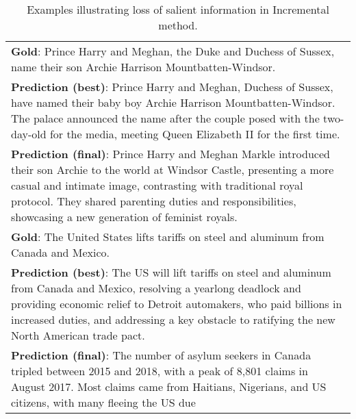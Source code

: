 \begin{table*}
{\begin{tabular}{p{24cm}}
    \midrule
    \textbf{Gold}: Prince Harry and Meghan, the Duke and Duchess of Sussex, name their son Archie Harrison Mountbatten-Windsor. \\
    \textbf{Prediction (best)}: Prince Harry and Meghan, Duchess of Sussex, have named their baby boy Archie Harrison Mountbatten-Windsor. The palace announced the name after the couple posed with the two-day-old for the media, meeting Queen Elizabeth II for the first time. \\
    \textbf{Prediction (final)}: Prince Harry and Meghan Markle introduced their son Archie to the world at Windsor Castle, presenting a more casual and intimate image, contrasting with traditional royal protocol. They shared parenting duties and responsibilities, showcasing a new generation of feminist royals.\\
    \midrule
    \textbf{Gold}: The United States lifts tariffs on steel and aluminum from Canada and Mexico. \\
    \textbf{Prediction (best)}: The US will lift tariffs on steel and aluminum from Canada and Mexico, resolving a yearlong deadlock and providing economic relief to Detroit automakers, who paid billions in increased duties, and addressing a key obstacle to ratifying the new North American trade pact. \\
    \textbf{Prediction (final)}: The number of asylum seekers in Canada tripled between 2015 and 2018, with a peak of 8,801 claims in August 2017. Most claims came from Haitians, Nigerians, and US citizens, with many fleeing the US due \\
    \midrule
    \bottomrule
    \end{tabular}}
    \caption{Examples illustrating loss of salient information in Incremental method.}
    \label{tab:qual_incremental}
\end{table*}
